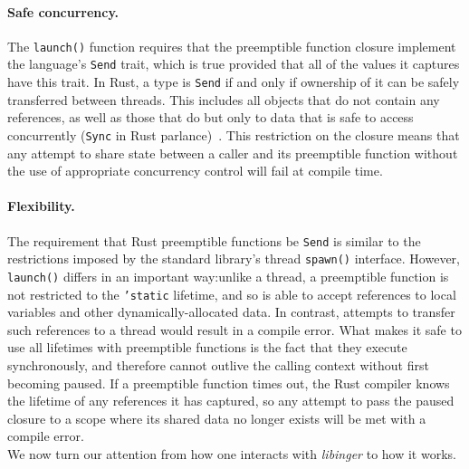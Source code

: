\paragraph{Safe concurrency.}
The \texttt{launch()} function requires that the preemptible function closure
implement the language's \texttt{Send} trait, which is true provided that all of the
values it captures have this trait.  In Rust, a type is \texttt{Send} if and only if
ownership of it can be safely transferred between threads.  This includes all objects
that do not contain any references, as well as those that do but only to data that is
safe to access concurrently (\texttt{Sync} in Rust parlance)~\cite{www-rustlang-conc}.
This restriction on
the closure means that any attempt to share state between a caller and its
preemptible function without the use of appropriate concurrency control will fail at
compile time.


\paragraph{Flexibility.}
The requirement that Rust preemptible functions be \texttt{Send} is similar to the
restrictions imposed by the standard library's thread \texttt{spawn()} interface.
However, \texttt{launch()} differs in an important way:\@ unlike a thread, a
preemptible function is not restricted to the \texttt{'static} lifetime, and so is
able to accept references to local variables and other dynamically-allocated data.
In contrast, attempts to transfer such references to a thread would result in a
compile error.  What makes it safe to use all lifetimes with preemptible functions is
the fact that they execute synchronously, and therefore cannot outlive the calling
context without first becoming paused.  If a preemptible function times out, the Rust
compiler knows the lifetime of any references it has captured, so any attempt to pass
the paused closure to a scope where its shared data no longer exists will be met with
a compile error.
\\

We now turn our attention from how one interacts with \textit{libinger} to how it
works.


\begin{promotesubsections}

\end{promotesubsections}




